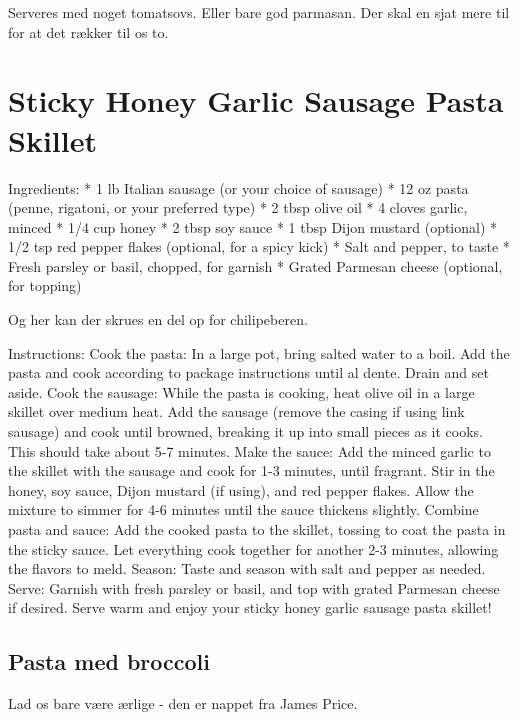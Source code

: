 \documentclass[
  letterpaper,
  DIV=11,
  numbers=noendperiod]{scrreprt}
\begin{document}
Serveres med noget tomatsovs. Eller bare god parmasan. Der skal en sjat
mere til for at det rækker til os to.

\hypertarget{sticky-honey-garlic-sausage-pasta-skillet}{%
\section{Sticky Honey Garlic Sausage Pasta
Skillet}\label{sticky-honey-garlic-sausage-pasta-skillet}}

Ingredients: * 1 lb Italian sausage (or your choice of sausage) * 12 oz
pasta (penne, rigatoni, or your preferred type) * 2 tbsp olive oil * 4
cloves garlic, minced * 1/4 cup honey * 2 tbsp soy sauce * 1 tbsp Dijon
mustard (optional) * 1/2 tsp red pepper flakes (optional, for a spicy
kick) * Salt and pepper, to taste * Fresh parsley or basil, chopped, for
garnish * Grated Parmesan cheese (optional, for topping)

Og her kan der skrues en del op for chilipeberen.

Instructions: Cook the pasta: In a large pot, bring salted water to a
boil. Add the pasta and cook according to package instructions until al
dente. Drain and set aside. Cook the sausage: While the pasta is
cooking, heat olive oil in a large skillet over medium heat. Add the
sausage (remove the casing if using link sausage) and cook until
browned, breaking it up into small pieces as it cooks. This should take
about 5-7 minutes. Make the sauce: Add the minced garlic to the skillet
with the sausage and cook for 1-3 minutes, until fragrant. Stir in the
honey, soy sauce, Dijon mustard (if using), and red pepper flakes. Allow
the mixture to simmer for 4-6 minutes until the sauce thickens slightly.
Combine pasta and sauce: Add the cooked pasta to the skillet, tossing to
coat the pasta in the sticky sauce. Let everything cook together for
another 2-3 minutes, allowing the flavors to meld. Season: Taste and
season with salt and pepper as needed. Serve: Garnish with fresh parsley
or basil, and top with grated Parmesan cheese if desired. Serve warm and
enjoy your sticky honey garlic sausage pasta skillet!

\hypertarget{pasta-med-broccoli-1}{%
\subsection{Pasta med broccoli}\label{pasta-med-broccoli-1}}

Lad os bare være ærlige - den er nappet fra James Price.
\end{document}
